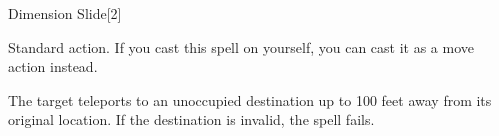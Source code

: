 \begin{spellsection}{Dimension Slide}[2]
    \begin{spellheader}
    \end{spellheader}
    \begin{spellcontent}
        \begin{spelltargetinginfo}
            \spelltime Standard action. If you cast this spell on yourself, you can cast it as a move action instead.
        \end{spelltargetinginfo}
        \begin{spelleffects}
            \spelleffect The target teleports to an unoccupied destination up to 100 feet away from its original location. If the destination is invalid, the spell fails.
        \end{spelleffects}
    \end{spellcontent}
    \begin{spellfooter}
        \miscastrandom
    \end{spellfooter}
    \begin{spellaugments}
    \end{spellaugments}
\end{spellsection}

